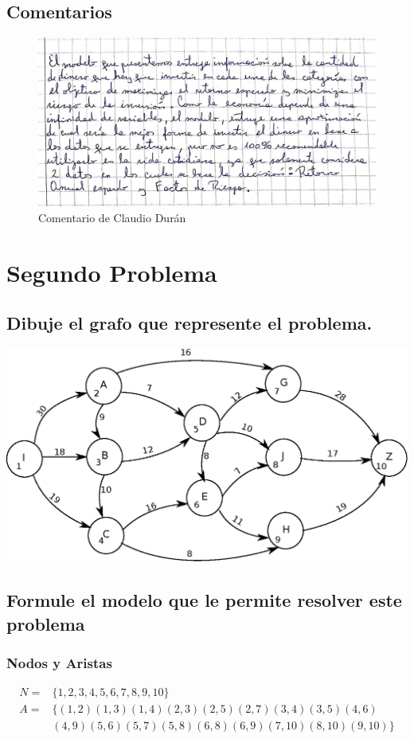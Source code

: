 \documentclass[a4paper,12pt]{article}
\begin{document}
\subsection{Comentarios}
\begin{figure}[H]
	\centering
	\includegraphics[scale=0.5]{claudio1.jpg}
	\caption*{Comentario de Claudio Durán}
\end{figure}
\newpage
\section{Segundo Problema}
\subsection{Dibuje el grafo que represente el problema.}
\includegraphics[scale=1]{drawing.eps}
\subsection{Formule el modelo que le permite resolver este problema}
\subsubsection{Nodos y Aristas}
\begin{equation*}
\begin{split}
	N = &\{1,2,3,4,5,6,7,8,9,10\} \\
	A = &\{ (1,2)(1,3)(1,4)(2,3)(2,5)(2,7)(3,4)(3,5)(4,6)\\
	  &(4,9)(5,6)(5,7)(5,8)(6,8)(6,9)(7,10)(8,10)(9,10) \}
\end{split}
\end{equation*}
\end{document}
